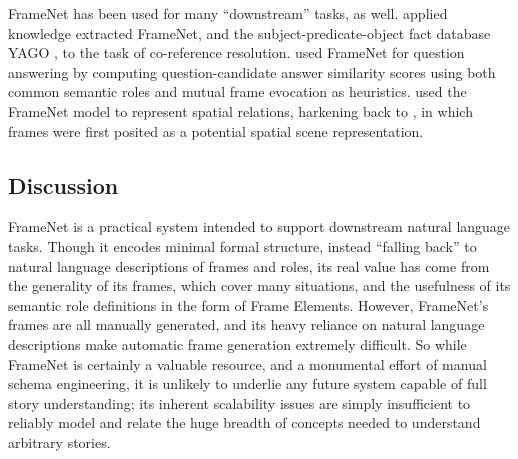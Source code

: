 FrameNet has been used for many ``downstream'' tasks, as well. \citet{rahman2011} applied knowledge extracted FrameNet, and the subject-predicate-object fact database YAGO \citep{yago}, to the task of co-reference resolution. \citet{shen2007using} used FrameNet for question answering by computing question-candidate answer similarity scores using both common semantic roles and mutual frame evocation as heuristics. \citet{framenetspatial} used the FrameNet model to represent spatial relations, harkening back to \citep{Minsky:1974:FRK:889222}, in which frames were first posited as a potential spatial scene representation.

\subsection{Discussion}

FrameNet is a practical system intended to support downstream natural language tasks. Though it encodes minimal formal structure, instead ``falling back'' to natural language descriptions of frames and roles, its real value has come from the generality of its frames, which cover many situations, and the usefulness of its semantic role definitions in the form of Frame Elements. However, FrameNet's frames are all manually generated, and its heavy reliance on natural language descriptions make automatic frame generation extremely difficult. So while FrameNet is certainly a valuable resource, and a monumental effort of manual schema engineering, it is unlikely to underlie any future system capable of full story understanding; its inherent scalability issues are simply insufficient to reliably model and relate the huge breadth of concepts needed to understand arbitrary stories.

